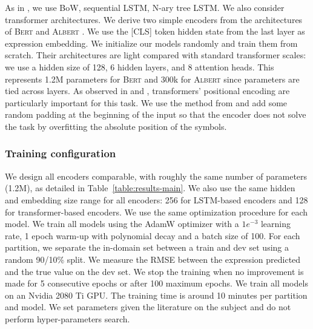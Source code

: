 As in , we use BoW, sequential LSTM, N-ary tree LSTM. We also consider transformer architectures. We derive two simple encoders from the architectures of \textsc{Bert} \parencite{devlin_19} and \textsc{Albert} \parencite{lan_20}. We use the \textsc{[CLS]} token hidden state from the last layer as expression embedding. We initialize our models randomly and train them from scratch. Their architectures are light compared with standard transformer scales: we use a hidden size of 128, 6 hidden layers, and 8 attention heads. This represents 1.2M parameters for \textsc{Bert} and 300k for \textsc{Albert} since parameters are tied across layers. As observed in \textcite{csordas_21} and \textcite{onta_21}, transformers' positional encoding are particularly important for this task. We use the method from \textcite{wallace_19} and add some random padding at the beginning of the input so that the encoder does not solve the task by overfitting the absolute position of the symbols.




\subsubsection{Training configuration}

We design all encoders comparable, with roughly the same number of parameters (1.2M), as detailed in Table~\ref{table:results-main}. We also use the same hidden and embedding size range for all encoders: 256 for LSTM-based encoders and 128 for transformer-based encoders. We use the same optimization procedure for each model.
We train all models using the AdamW optimizer \parencite{loshchilov_19} with a $1e^{-3}$ learning rate, 1 epoch warm-up with polynomial decay and a batch size of 100. For each partition, we separate the in-domain set between a train and dev set using a random 90/10\% split. We measure the RMSE between the expression predicted and the true value on the dev set. We stop the training when no improvement is made for 5 consecutive epochs or after 100 maximum epochs. We train all models on an Nvidia 2080 Ti GPU. The training time is around 10 minutes per partition and model. We set parameters given the literature on the subject and do not perform hyper-parameters search.

